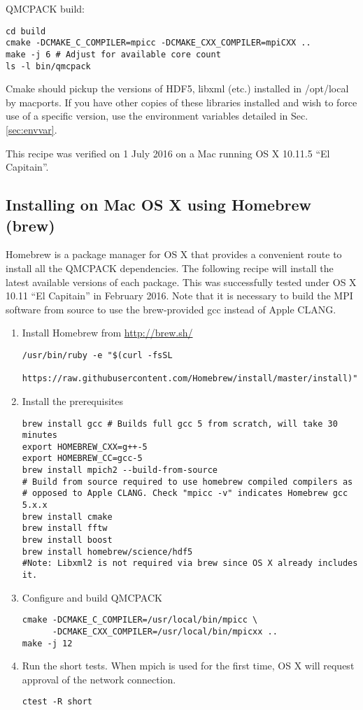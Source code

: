 QMCPACK build:
\begin{verbatim}
cd build
cmake -DCMAKE_C_COMPILER=mpicc -DCMAKE_CXX_COMPILER=mpiCXX ..
make -j 6 # Adjust for available core count
ls -l bin/qmcpack 
\end{verbatim}

Cmake should pickup the versions of HDF5, libxml (etc.) installed in
/opt/local by macports. If you have other copies of these libraries
installed and wish to force use of a specific version, use the
environment variables detailed in Sec. \ref{sec:envvar}.

This recipe was verified on 1 July 2016 on a Mac running OS X 10.11.5
``El Capitain''.

\subsection{Installing on Mac OS X using Homebrew (brew)}
Homebrew is a package manager for OS X that provides a convenient
route to install all the QMCPACK dependencies. The
following recipe will install the latest available versions of each
package. This was successfully tested under OS X 10.11 ``El
Capitain'' in February 2016. Note that it is necessary to build the MPI software from
source to use the brew-provided gcc instead of Apple CLANG.

\begin{enumerate}
\item Install Homebrew from \url{http://brew.sh/}
\begin{verbatim}
/usr/bin/ruby -e "$(curl -fsSL 
    https://raw.githubusercontent.com/Homebrew/install/master/install)"
\end{verbatim}

\item Install the prerequisites
\begin{verbatim}
brew install gcc # Builds full gcc 5 from scratch, will take 30 minutes
export HOMEBREW_CXX=g++-5
export HOMEBREW_CC=gcc-5
brew install mpich2 --build-from-source
# Build from source required to use homebrew compiled compilers as
# opposed to Apple CLANG. Check "mpicc -v" indicates Homebrew gcc 5.x.x
brew install cmake
brew install fftw 
brew install boost
brew install homebrew/science/hdf5
#Note: Libxml2 is not required via brew since OS X already includes it.
\end{verbatim}
\item Configure and build QMCPACK
\begin{verbatim}
cmake -DCMAKE_C_COMPILER=/usr/local/bin/mpicc \
      -DCMAKE_CXX_COMPILER=/usr/local/bin/mpicxx ..
make -j 12
\end{verbatim}
\item Run the short tests. When mpich is used for the first time, OS
  X will request approval of the network connection.
\begin{verbatim}
ctest -R short
\end{verbatim}
\end{enumerate}

